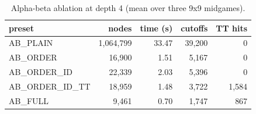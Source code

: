 \begin{table}[ht]
\centering
\begin{tabular}{lrrrr}
\toprule
preset & nodes & time (s) & cutoffs & TT hits \\
\midrule
AB\_PLAIN & 1,064,799 & 33.47 & 39,200 & 0 \\
AB\_ORDER & 16,900 & 1.51 & 5,167 & 0 \\
AB\_ORDER\_ID & 22,339 & 2.03 & 5,396 & 0 \\
AB\_ORDER\_ID\_TT & 18,959 & 1.48 & 3,722 & 1,584 \\
AB\_FULL & 9,461 & 0.70 & 1,747 & 867 \\
\bottomrule
\end{tabular}
\caption{Alpha-beta ablation at depth 4 (mean over three 9x9 midgames).}
\label{tab:ab-ablation}
\end{table}
